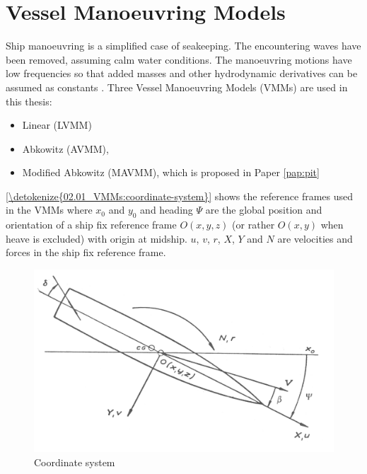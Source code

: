 \section{Vessel Manoeuvring Models} \label{sec:VMM}
\label{\detokenize{02.01_VMMs:vessel-manoeuvring-models}}\label{\detokenize{02.01_VMMs:vmm}}\label{\detokenize{02.01_VMMs::doc}}
Ship manoeuvring is a simplified case of seakeeping. The encountering waves have been removed, assuming calm water conditions. The manoeuvring motions have low frequencies so that added masses and other hydrodynamic derivatives can be assumed as constants  \cite{fossen_handbook_2021}. Three Vessel Manoeuvring Models (VMMs) are used in this thesis: 
\begin{itemize}
    \item Linear (LVMM) \cite{matusiak_dynamics_2017}
    \item Abkowitz (AVMM), \cite{abkowitz_ship_1964}
    \item Modified Abkowitz (MAVMM), which is proposed in Paper \ref{pap:pit}
\end{itemize}

\noindent\autoref{\detokenize{02.01_VMMs:coordinate-system}} shows the reference frames used in the VMMs where \(x_0\) and \(y_0\) and heading \(\Psi\) are the global position and orientation of a ship fix reference frame \(O(x,y,z)\) (or rather \(O(x,y)\) when heave is excluded) with origin at midship. \(u\), \(v\), \(r\), \(X\), \(Y\) and \(N\) are velocities and forces in the ship fix reference frame.



\begin{figure}[H]
    \centering
    \includegraphics[width=\textwidth]{kappa/images/coordinate_system.PNG}
    \caption{Coordinate system}
    \label{\detokenize{02.01_VMMs:coordinate-system}}
\end{figure}

